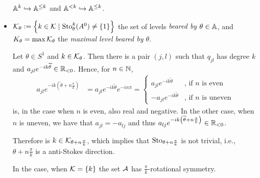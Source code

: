 \begin{notations}
\begin{itemize}
\begin{s-rem}
        $\mathbb{A}^k\hookrightarrow\mathbb{A}^{\leq k}$ and
        $\mathbb{A}^{<k}\hookrightarrow\mathbb{A}^{\leq k}$.
      \end{s-rem}
    \item $\mathcal{K}_\theta:=\left\{k\in\mathcal{K}\mid\operatorname{Sto}_\theta^k(A^0)\neq\{1\}\right\}$
      the set of levels \emph{beared by $\theta\in\mathbb{A}$}, and
      $K_\theta=\max\mathcal{K}_\theta$ the \emph{maximal level beared by $\theta$}.
      \begin{s-rem}
        Let $\theta\in S^1$ and $k\in\mathcal{K}_\theta$. Then there is a pair $(j,l)$
        such that $q_{jl}$ has degree $k$ and
        $a_{jl}e^{-ik\widetilde\theta}\in\mathbb{R}_{<0}$. Hence, for $n\in\mathbb{N}$,
        \begin{align*}
          a_{jl}e^{-ik\left(\tilde\theta+n\frac{\pi}{k}\right)}
          &=a_{jl}e^{-ik\tilde\theta}e^{-in\pi}
          = \begin{cases}
            a_{jl}e^{-ik\tilde\theta} & \text{, if $n$ is even}
          \\-a_{jl}e^{-ik\tilde\theta} & \text{, if $n$ is uneven}
        \end{cases}
        \end{align*}
        is, in the case when $n$ is even, also real and negative. In the other
        case, when $n$ is uneven, we have that $a_{jl}=-a_{lj}$ and thus
        $a_{lj}e^{-ik\left(\widetilde\theta+n\frac{\pi}{k}\right)}\in\mathbb{R}_{<0}$.

        Therefore is $k\in\mathcal{K}_{\theta+n\frac{\pi}{k}}$, which implies that
        $\operatorname{Sto}_{\theta+n\frac{\pi}{k}}$ is not trivial, i.e.,
        $\theta+n\frac{\pi}{k}$ is a anti-Stokes direction.

        In the case, when $\mathcal{K}=\{k\}$ the set $\mathcal{A}$ has
        $\frac{\pi}{k}$-rotational symmetry.
      \end{s-rem}
  \end{itemize}
\end{notations}


